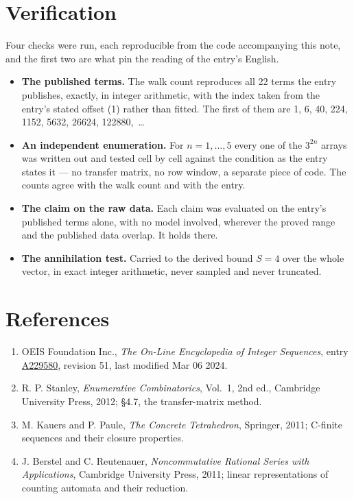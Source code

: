 \documentclass[11pt]{article}
\theoremstyle{definition}
\begin{document}
\section{Verification}

Four checks were run, each reproducible from the code accompanying this note, and the first two are what pin the reading of the entry's English.

\begin{itemize}

\item {\bfseries The published terms.} The walk count reproduces all 22 terms the entry publishes, exactly, in integer arithmetic, with the index taken from the entry's stated offset (1) rather than fitted. The first of them are 1, 6, 40, 224, 1152, 5632, 26624, 122880,~\dots

\item {\bfseries An independent enumeration.} For $n = 1,\dots,5$ every one of the $3^{2n}$ arrays was written out and tested cell by cell against the condition as the entry states it --- no transfer matrix, no row window, a separate piece of code. The counts agree with the walk count and with the entry.

\item {\bfseries The claim on the raw data.} Each claim was evaluated on the entry's published terms alone, with no model involved, wherever the proved range and the published data overlap. It holds there.

\item {\bfseries The annihilation test.} Carried to the derived bound $S = 4$ over the whole vector, in exact integer arithmetic, never sampled and never truncated.

\end{itemize}

\section{References}

\begin{enumerate}

\item OEIS Foundation Inc., \emph{The On-Line Encyclopedia of Integer Sequences}, entry \href{https://oeis.org/A229580}{A229580}, revision 51, last modified Mar 06 2024.

\item R. P. Stanley, \emph{Enumerative Combinatorics}, Vol.~1, 2nd ed., Cambridge University Press, 2012; \S4.7, the transfer-matrix method.

\item M. Kauers and P. Paule, \emph{The Concrete Tetrahedron}, Springer, 2011; C-finite sequences and their closure properties.

\item J. Berstel and C. Reutenauer, \emph{Noncommutative Rational Series with Applications}, Cambridge University Press, 2011; linear representations of counting automata and their reduction.

\end{enumerate}
\end{document}
